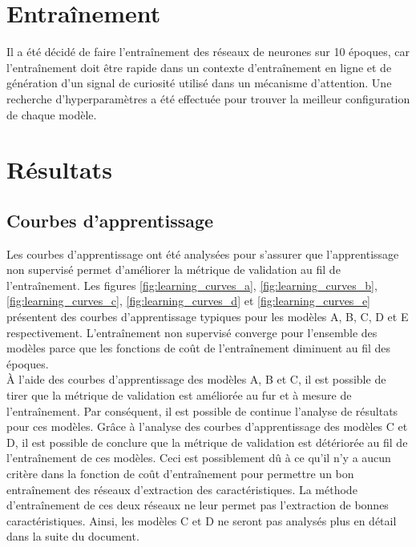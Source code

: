 \section{Entraînement}
    Il a été décidé de faire l'entraînement des réseaux de neurones sur 10 époques, car l'entraînement doit être rapide dans un contexte d'entraînement en ligne et de génération d'un signal de curiosité utilisé dans un mécanisme d'attention. Une recherche d'hyperparamètres a été effectuée pour trouver la meilleur configuration de chaque modèle.
    
\section{Résultats}

\subsection{Courbes d'apprentissage}
    Les courbes d'apprentissage ont été analysées pour s'assurer que l'apprentissage non supervisé permet d'améliorer la métrique de validation au fil de l'entraînement. Les figures \ref{fig:learning_curves_a}, \ref{fig:learning_curves_b}, \ref{fig:learning_curves_c}, \ref{fig:learning_curves_d} et \ref{fig:learning_curves_e} présentent des courbes d'apprentissage typiques pour les modèles A, B, C, D et E respectivement. L'entraînement non supervisé converge pour l'ensemble des modèles parce que les fonctions de coût de l'entraînement diminuent au fil des époques.\\

    À l'aide des courbes d'apprentissage des modèles A, B et C, il est possible de tirer que la métrique de validation est améliorée au fur et à mesure de l'entraînement. Par conséquent, il est possible de continue l'analyse de résultats pour ces modèles. Grâce à l'analyse des courbes d'apprentissage des modèles C et D, il est possible de conclure que la métrique de validation est détériorée au fil de  l'entraînement de ces modèles. Ceci est possiblement dû à ce qu'il n'y a aucun critère dans la fonction de coût d'entraînement pour permettre un bon entraînement des réseaux d'extraction des caractéristiques. La méthode d'entraînement de ces deux réseaux ne leur permet pas l'extraction de bonnes caractéristiques. Ainsi, les modèles C et D ne seront pas analysés plus en détail dans la suite du document.

